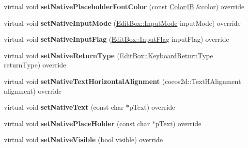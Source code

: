 \begin{DoxyCompactItemize}
virtual void {\bfseries set\+Native\+Placeholder\+Font\+Color} (const \hyperlink{structColor4B}{Color4B} \&color) override
\item 
\mbox{\label{classui_1_1EditBoxImplAndroid_ab561d232c45403cea2df14f300d5a1dc}} 
virtual void {\bfseries set\+Native\+Input\+Mode} (\hyperlink{classui_1_1EditBox_a7a1bfe8f3ba218bedfcf5451ec3ce01a}{Edit\+Box\+::\+Input\+Mode} input\+Mode) override
\item 
\mbox{\label{classui_1_1EditBoxImplAndroid_af7614ec1eef23ba50bd68447162bcdd9}} 
virtual void {\bfseries set\+Native\+Input\+Flag} (\hyperlink{classui_1_1EditBox_af02f13ee9fba51d59bb3111e200848c8}{Edit\+Box\+::\+Input\+Flag} input\+Flag) override
\item 
\mbox{\label{classui_1_1EditBoxImplAndroid_a77ea97a6e8d796d2c42412a63a3759a4}} 
virtual void {\bfseries set\+Native\+Return\+Type} (\hyperlink{classui_1_1EditBox_a1e1285b6f742975b26bdeb8108ca6e51}{Edit\+Box\+::\+Keyboard\+Return\+Type} return\+Type) override
\item 
\mbox{\label{classui_1_1EditBoxImplAndroid_a633959d34021117660737a5e2dfd91ba}} 
virtual void {\bfseries set\+Native\+Text\+Horizontal\+Alignment} (cocos2d\+::\+Text\+H\+Alignment alignment) override
\item 
\mbox{\label{classui_1_1EditBoxImplAndroid_a7c390452ed0f8ab232631565304b7c55}} 
virtual void {\bfseries set\+Native\+Text} (const char $\ast$p\+Text) override
\item 
\mbox{\label{classui_1_1EditBoxImplAndroid_a8ed3531f696ceb5fce7f5b7c453933be}} 
virtual void {\bfseries set\+Native\+Place\+Holder} (const char $\ast$p\+Text) override
\item 
\mbox{\label{classui_1_1EditBoxImplAndroid_abdc2b30a8b4293eac69cc08de5ad8d15}} 
virtual void {\bfseries set\+Native\+Visible} (bool visible) override
\item 
\mbox{\label{classui_1_1EditBoxImplAndroid_ab9aa33ae3cdea65df62881a3c4add2c7}} 

\end{DoxyCompactItemize}
